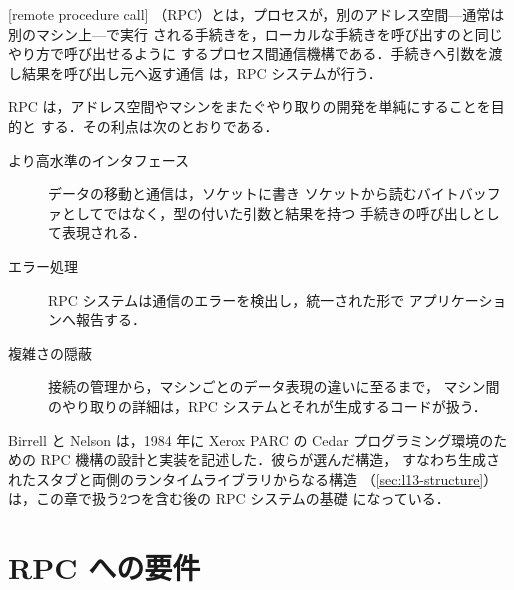 \documentclass[../main.tex]{subfiles}
\begin{document}
\begin{definition}[遠隔手続き呼び出し]
  [remote procedure call]
  （RPC）とは，プロセスが，別のアドレス空間---通常は別のマシン上---で実行
  される手続きを，ローカルな手続きを呼び出すのと同じやり方で呼び出せるように
  するプロセス間通信機構である．手続きへ引数を渡し結果を呼び出し元へ返す通信
  は，RPC システムが行う．
\end{definition}

RPC は，アドレス空間やマシンをまたぐやり取りの開発を単純にすることを目的と
する．その利点は次のとおりである．
\begin{description}
  \item[より高水準のインタフェース] データの移動と通信は，ソケットに書き
    ソケットから読むバイトバッファとしてではなく，型の付いた引数と結果を持つ
    手続きの呼び出しとして表現される．
  \item[エラー処理] RPC システムは通信のエラーを検出し，統一された形で
    アプリケーションへ報告する．
  \item[複雑さの隠蔽] 接続の管理から，マシンごとのデータ表現の違いに至るまで，
    マシン間のやり取りの詳細は，RPC システムとそれが生成するコードが扱う．
\end{description}

Birrell と Nelson \cite{birrell1984} は，1984 年に Xerox PARC の Cedar
プログラミング環境のための RPC 機構の設計と実装を記述した．彼らが選んだ構造，
すなわち生成されたスタブと両側のランタイムライブラリからなる構造
（\cref{sec:l13-structure}）は，この章で扱う2つを含む後の RPC システムの基礎
になっている．

\section{RPC への要件}
\label{sec:l13-requirements}
\end{document}

